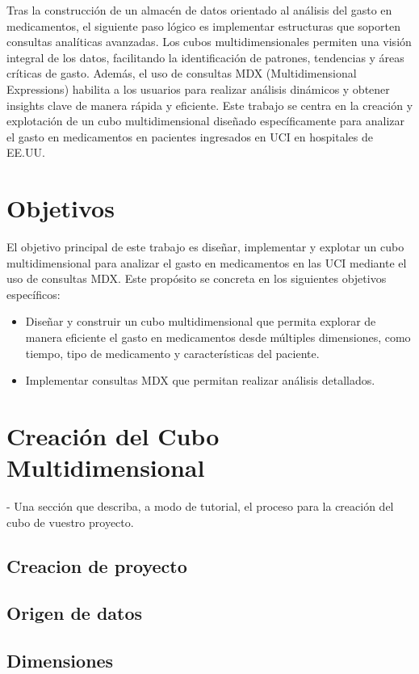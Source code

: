 \documentclass{article}
\begin{document}
Tras la construcción de un almacén de datos orientado al análisis del gasto en medicamentos, el siguiente paso lógico es implementar estructuras que soporten consultas analíticas avanzadas. Los cubos multidimensionales permiten una visión integral de los datos, facilitando la identificación de patrones, tendencias y áreas críticas de gasto. Además, el uso de consultas MDX (Multidimensional Expressions) habilita a los usuarios para realizar análisis dinámicos y obtener insights clave de manera rápida y eficiente. Este trabajo se centra en la creación y explotación de un cubo multidimensional diseñado específicamente para analizar el gasto en medicamentos en pacientes ingresados en UCI en hospitales de EE.UU.

\section{Objetivos}
\label{sec:objetivos}

El objetivo principal de este trabajo es diseñar, implementar y explotar un cubo multidimensional para analizar el gasto en medicamentos en las UCI mediante el uso de consultas MDX. Este propósito se concreta en los siguientes objetivos específicos:

\begin{itemize}
	\item Diseñar y construir un cubo multidimensional que permita explorar de manera eficiente el gasto en medicamentos desde múltiples dimensiones, como tiempo, tipo de medicamento y características del paciente.
	\item Implementar consultas MDX que permitan realizar análisis detallados.

\end{itemize}

	\section{Creación del Cubo Multidimensional}
	  - Una sección que describa, a modo de tutorial, el proceso para la creación del cubo de vuestro proyecto. 

	\subsection{Creacion de proyecto}
	\subsection{Origen de datos}
	\subsection{Dimensiones}
	
\end{document}
